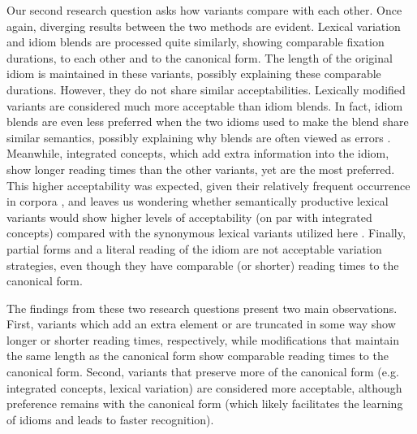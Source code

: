 \documentclass[output=paper,modfonts,nonflat]{langsci/langscibook}
\begin{document}
Our second research question asks how variants compare with each other. Once again, diverging results between the two methods are evident.  Lexical variation and idiom blends are processed quite similarly, showing comparable fixation durations, to each other and to the canonical form. The length of the original idiom is maintained in these variants, possibly explaining these comparable durations. However, they do not share similar acceptabilities. Lexically modified variants are considered much more acceptable than idiom blends. In fact, idiom blends are even less preferred when the two idioms used to make the blend share similar semantics, possibly explaining why blends are often viewed as errors \citep{Fay1982, CuttingBock1997}. Meanwhile, integrated concepts, which add extra information into the idiom, show longer reading times than the other variants, yet are the most preferred. This higher acceptability was expected, given their relatively frequent occurrence in corpora \citep{Moon1998, Schroder2013}, and leaves us wondering whether semantically productive lexical variants \citep[cf.][]{McGloneEtAl1994} would show higher levels of acceptability (on par with integrated concepts) compared with the synonymous lexical variants utilized here \citep[following][]{GibbsEtAl1989}. Finally, partial forms and a literal reading of the idiom are not acceptable variation strategies, even though they have comparable (or shorter) reading times to the canonical form.

The findings from these two research questions present two main observations. First, variants which add an extra element or are truncated in some way show longer or shorter reading times, respectively, while modifications that maintain the same length as the canonical form show comparable reading times to the canonical form. Second, variants that preserve more of the canonical form (e.g. integrated concepts, lexical variation) are considered more acceptable, although preference remains with the canonical form (which likely facilitates the learning of idioms and leads to faster recognition).
\end{document}
